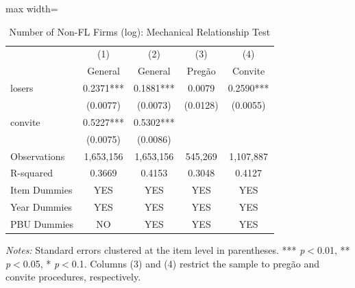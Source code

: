 \begin{table}[htbp]
\centering
\caption{Number of Non-FL Firms (log): Mechanical Relationship Test}
\label{tab:nfirms_excl}
\begin{adjustbox}{max width=\textwidth}
\begin{threeparttable}
\small
\begin{tabular}{lcccc}
\toprule
 & (1) & (2) & (3) & (4) \\
 & General & General & Preg\~{a}o & Convite \\
\midrule
losers & 0.2371*** & 0.1881*** & 0.0079 & 0.2590*** \\
 & (0.0077) & (0.0073) & (0.0128) & (0.0055) \\
convite & 0.5227*** & 0.5302*** &  &  \\
 & (0.0075) & (0.0086) &  &  \\
\midrule
Observations & 1,653,156 & 1,653,156 & 545,269 & 1,107,887 \\
R-squared & 0.3669 & 0.4153 & 0.3048 & 0.4127 \\
Item Dummies & YES & YES & YES & YES \\
Year Dummies & YES & YES & YES & YES \\
PBU Dummies & NO & YES & YES & YES \\
\bottomrule
\end{tabular}
\begin{tablenotes}
\small
\item \textit{Notes:} Standard errors clustered at the item level in parentheses.
*** \textit{p}$<$0.01, ** \textit{p}$<$0.05, * \textit{p}$<$0.1.
Columns (3) and (4) restrict the sample to preg\~{a}o and convite procedures, respectively.
\end{tablenotes}
\end{threeparttable}
\end{adjustbox}
\end{table}
